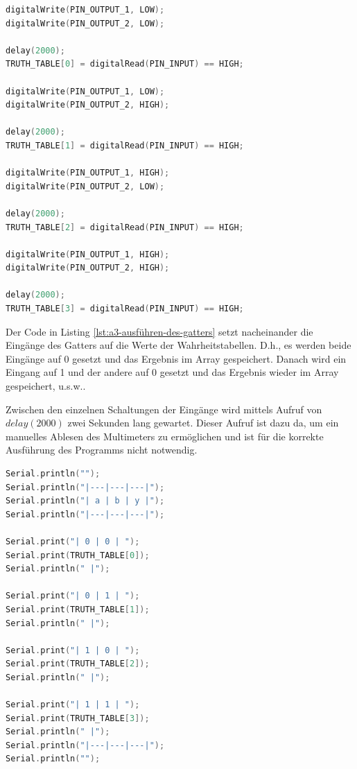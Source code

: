 \begin{lstlisting}[language=C,label={lst:a3-ausführen-des-gatters}, caption={Ausführen der Logikfunktionen}]
digitalWrite(PIN_OUTPUT_1, LOW);
digitalWrite(PIN_OUTPUT_2, LOW);

delay(2000);
TRUTH_TABLE[0] = digitalRead(PIN_INPUT) == HIGH;

digitalWrite(PIN_OUTPUT_1, LOW);
digitalWrite(PIN_OUTPUT_2, HIGH);

delay(2000);
TRUTH_TABLE[1] = digitalRead(PIN_INPUT) == HIGH;

digitalWrite(PIN_OUTPUT_1, HIGH);
digitalWrite(PIN_OUTPUT_2, LOW);

delay(2000);
TRUTH_TABLE[2] = digitalRead(PIN_INPUT) == HIGH;

digitalWrite(PIN_OUTPUT_1, HIGH);
digitalWrite(PIN_OUTPUT_2, HIGH);

delay(2000);
TRUTH_TABLE[3] = digitalRead(PIN_INPUT) == HIGH;
\end{lstlisting}

\newpage

Der Code in Listing \ref{lst:a3-ausführen-des-gatters} setzt nacheinander die Eingänge des Gatters auf die Werte der Wahrheitstabellen.
D.h., es werden beide Eingänge auf 0 gesetzt und das Ergebnis im Array gespeichert.
Danach wird ein Eingang auf 1 und der andere auf 0 gesetzt und das Ergebnis wieder im Array gespeichert, u.s.w..

Zwischen den einzelnen Schaltungen der Eingänge wird mittels Aufruf von $delay(2000)$ zwei Sekunden lang gewartet.
Dieser Aufruf ist dazu da, um ein manuelles Ablesen des Multimeters zu ermöglichen und ist für die korrekte Ausführung des Programms nicht notwendig.

\begin{lstlisting}[language=C,label={lst:a3-aausgabe-der-wahrheitstabelle}, caption={Ausgabe der Wahrheitstabelle}]
Serial.println("");
Serial.println("|---|---|---|");
Serial.println("| a | b | y |");
Serial.println("|---|---|---|");

Serial.print("| 0 | 0 | ");
Serial.print(TRUTH_TABLE[0]);
Serial.println(" |");

Serial.print("| 0 | 1 | ");
Serial.print(TRUTH_TABLE[1]);
Serial.println(" |");

Serial.print("| 1 | 0 | ");
Serial.print(TRUTH_TABLE[2]);
Serial.println(" |");

Serial.print("| 1 | 1 | ");
Serial.print(TRUTH_TABLE[3]);
Serial.println(" |");
Serial.println("|---|---|---|");
Serial.println("");
\end{lstlisting}

